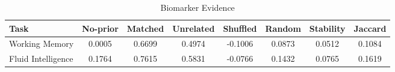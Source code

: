 \begin{table}[ht]
\centering
\caption{Biomarker Evidence}
\begin{tabular}{lccccccc}
\toprule
Task & No-prior & Matched & Unrelated & Shuffled & Random & Stability & Jaccard \\
\midrule
Working Memory & 0.0005 & 0.6699 & 0.4974 & -0.1006 & 0.0873 & 0.0512 & 0.1084 \\
Fluid Intelligence & 0.1764 & 0.7615 & 0.5831 & -0.0766 & 0.1432 & 0.0765 & 0.1619 \\
\bottomrule
\end{tabular}
\end{table}
